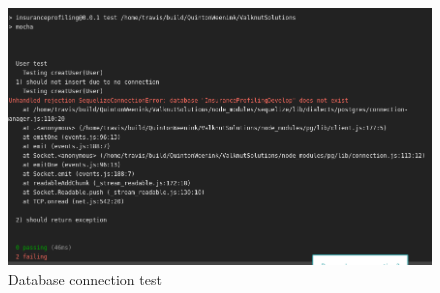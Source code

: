 \documentclass{article}
\begin{document}
\begin{figure}[h]
  \centering
      \includegraphics[width=\textwidth]{images/DBConnectionFailed.png}
  \caption{Database connection test}
  \label{fig:DBFailed}
\end{figure}
\end{document}

